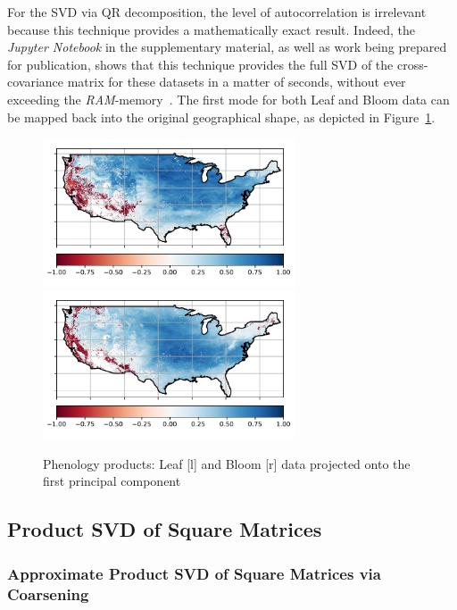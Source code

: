 \documentclass[ijgi,article,submit,moreauthors,pdftex,10pt,a4paper]{Definitions/mdpi}
\begin{document}
For the SVD via QR decomposition, the level of autocorrelation is irrelevant because this technique provides a mathematically exact result. Indeed, the \textit{Jupyter Notebook} in the supplementary material, as well as work being prepared for publication, shows that this technique provides the full SVD of the cross-covariance matrix for these datasets in a matter of seconds, without ever exceeding the \textit{RAM}-memory~\cite{Bogaardt2018, ZuritaMilla2018}. The first mode for both Leaf and Bloom data can be mapped back into the original geographical shape, as depicted in Figure~\ref{fig:maps}.

\begin{figure}[H]
\centering
\includegraphics[width=7.5cm]{Results/SpatialModeV01Grid.pdf} ~~~~~ \includegraphics[width=7.5cm]{Results/SpatialModeU01Grid.pdf}
\caption{Phenology products: Leaf [l] and Bloom [r] data projected onto the first principal component}
\label{fig:maps}
\end{figure}

\subsection{Product SVD of Square Matrices}
\label{sec:Results/Product SVD of Square Matrices}

\subsubsection{Approximate Product SVD of Square Matrices via Coarsening}
\label{sec:Results/Approximate Product SVD of Square Matrices via Coarsening}
\end{document}
